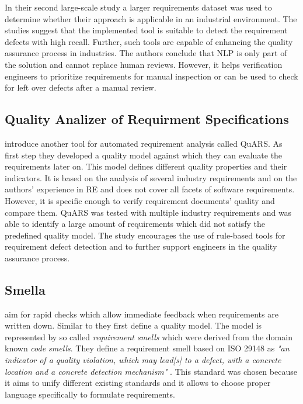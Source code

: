 In their second large-scale study a larger requirements dataset was used to determine whether their approach is applicable in an industrial environment.
The studies suggest that the implemented tool is suitable to detect the requirement defects with high recall.
Further, such tools are capable of enhancing the quality assurance process in industries.
The authors conclude that \ac{NLP} is only part of the solution and cannot replace human reviews.
However, it helps verification engineers to prioritize requirements for manual inspection or can be used to check for left over defects after a manual review.

\subsection{Quality Analizer of Requirment Specifications}
\textcite{Fabbrini:2002} introduce another tool for automated requirement analysis called \ac{QuARS}.
As first step they developed a quality model against which they can evaluate the requirements later on.
This model defines different quality properties and their indicators.
It is based on the analysis of several industry requirements and on the authors' experience in \ac{RE} and does not cover all facets of software requirements.
However, it is specific enough to verify requirement documents' quality and compare them.
\Ac{QuARS} was tested with multiple industry requirements and was able to identify a large amount of requirements which did not satisfy the predefined quality model.
The study encourages the use of rule-based tools for requirement defect detection and to further support engineers in the quality assurance process.

\subsection{Smella}
\textcite{Femmer:2017} aim for rapid checks which allow immediate feedback when requirements are written down.
Similar to \textcite{Fabbrini:2002} they first define a quality model.
The model is represented by so called \textit{requirement smells} which were derived from the domain known \textit{code smells}.
They define a requirement smell based on ISO 29148 as \textit{"an indicator of a quality violation, which may lead[s] to a defect, with a concrete location and a concrete detection mechanism"} \parencite{Femmer:2017}.
This standard was chosen because it aims to unify different existing standards and it allows to choose proper language specifically to formulate requirements.

